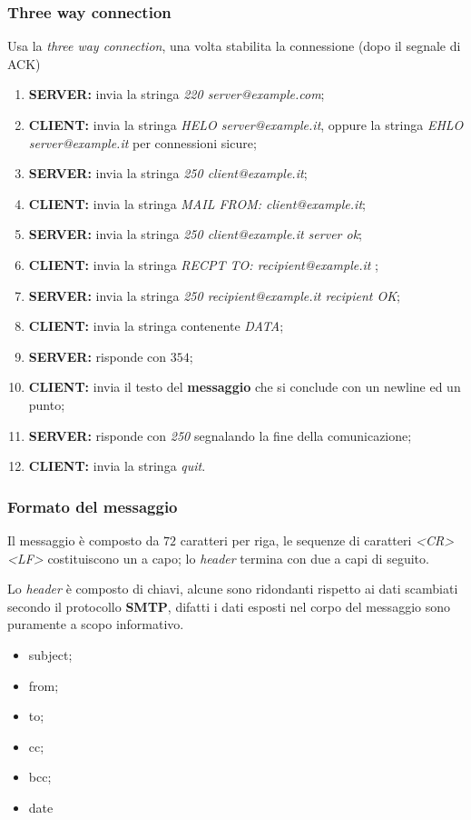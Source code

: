 \subsubsection{Three way connection}
Usa la \emph{three way connection}, una volta stabilita la connessione (dopo il
segnale di ACK)

\begin{enumerate}
  \item \textbf{SERVER:} invia la stringa \emph{220 server@example.com};
  \item \textbf{CLIENT:} invia la stringa \emph{HELO server@example.it}, oppure
    la stringa \emph{EHLO server@example.it} per connessioni sicure;
  \item \textbf{SERVER:} invia la stringa \emph{250 client@example.it};
  \item \textbf{CLIENT:} invia la stringa \emph{MAIL FROM: client@example.it};
  \item \textbf{SERVER:} invia la stringa \emph{250 client@example.it server
    ok};
  \item \textbf{CLIENT:} invia la stringa \emph{RECPT TO: recipient@example.it}
    ;
  \item \textbf{SERVER:} invia la stringa \emph{250 recipient@example.it 
    recipient OK};
  \item \textbf{CLIENT:} invia la stringa contenente \emph{DATA};
  \item \textbf{SERVER:} risponde con $354$;
  \item \textbf{CLIENT:} invia il testo del \textbf{messaggio} che si conclude
    con un newline ed un punto;
  \item \textbf{SERVER:} risponde con \emph{250} segnalando la fine della
    comunicazione;
  \item \textbf{CLIENT:} invia la stringa \emph{quit}.
\end{enumerate}

\subsubsection{Formato del messaggio}
Il messaggio è composto da $72$ caratteri per riga, le sequenze di caratteri
\emph{<CR><LF>} costituiscono un a capo; lo \emph{header} termina con due
a capi di seguito.

Lo \emph{header} è composto di chiavi, alcune sono ridondanti rispetto ai dati
scambiati secondo il protocollo \textbf{SMTP}, difatti i dati esposti nel
corpo del messaggio sono puramente a scopo informativo.
\begin{itemize}
  \item subject;
  \item from;
  \item to;
  \item cc;
  \item bcc;
  \item date
\end{itemize}


